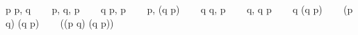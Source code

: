 \documentclass{article}
\begin{document}
\prooftree
\prooftree
\prooftree
\prooftree
\prooftree
p \vdash p, q \ \ \ 
\justifies
 \vdash p, q, \lnot p \ \ \ 
\endprooftree
\justifies
\lnot q \vdash \lnot p, p \ \ \ 
\endprooftree
\justifies
 \vdash p, (\lnot q \to \lnot p) \ \ \ 
\endprooftree
\prooftree
\prooftree
q \vdash q, \lnot p \ \ \ 
\justifies
q, \lnot q \vdash \lnot p \ \ \ 
\endprooftree
\justifies
q \vdash (\lnot q \to \lnot p) \ \ \ 
\endprooftree
\justifies
(p \to q) \vdash (\lnot q \to \lnot p) \ \ \ 
\endprooftree
\justifies
 \vdash ((p \to q) \to (\lnot q \to \lnot p)) \ \ \ 
\endprooftree
\end{document}
